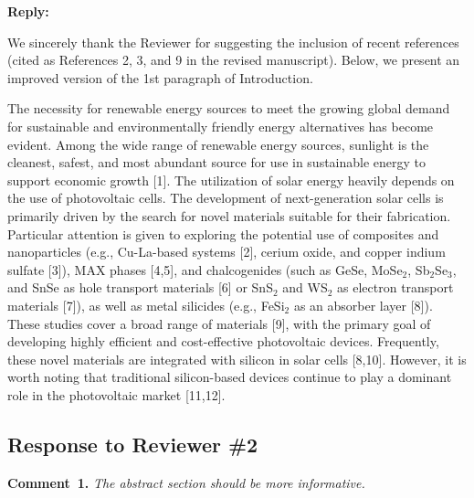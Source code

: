 \documentclass[a4paper,fleqn]{cas-sc}
\begin{document}





\noindent
\textcolor[rgb]{0.51,0.00,0.00}{\textbf{Reply:}}

We sincerely thank the Reviewer for suggesting the inclusion of recent references (cited as References 2, 3, and 9 in the revised manuscript).
Below, we present an improved version of the 1st paragraph of Introduction.


\begin{mdframed}
The necessity for renewable energy sources to meet the growing global demand for sustainable and environmentally friendly energy alternatives has become evident.
Among the wide range of renewable energy sources, sunlight is the cleanest, safest,
and most abundant source for use in sustainable energy to support economic growth [1].
The utilization of solar energy heavily depends on the use of photovoltaic cells.
\textcolor[rgb]{1.00,0.07,0.00}{
The development of next-generation solar cells is primarily driven by the search for novel materials suitable for their fabrication.
Particular attention is given to exploring the potential use of composites and nanoparticles
(e.g., Cu-La-based systems [2], cerium oxide, and copper indium sulfate [3]),
MAX phases [4,5],
and chalcogenides (such as GeSe, MoSe$_2$, Sb$_2$Se$_3$, and SnSe as hole transport materials [6]
or SnS$_2$ and WS$_2$ as electron transport materials [7]),
as well as metal silicides (e.g., FeSi$_2$ as an absorber layer [8]).
These studies cover a broad range of materials [9], with the primary goal of developing highly efficient and cost-effective photovoltaic devices.
Frequently, these novel materials are integrated with silicon in solar cells [8,10].
However, it is worth noting that traditional} silicon-based devices
\textcolor[rgb]{1.00,0.07,0.00}{continue} to play
\textcolor[rgb]{1.00,0.07,0.00}{a dominant role in the photovoltaic market} [11,12].
\end{mdframed}



\vspace{1cm}
\subsection*{Response to Reviewer \#2 }

\noindent
\textcolor[rgb]{0.00,0.50,1.00}{\textbf{Comment~1.}}
\emph{The abstract section should be more informative.}
\end{document}
